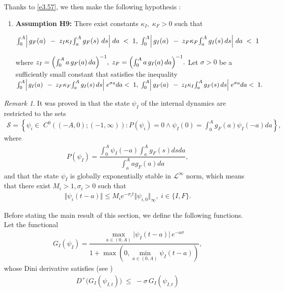 \documentclass[10pt, a4paper]{amsart}
\theoremstyle{plain}
\theoremstyle{definition}
\theoremstyle{remark}
\newtheorem{remark}[lemma]{Remark}
\numberwithin{equation}{section}
\begin{document}
Thanks to \eqref{e3.57}, 
we then make the following hypothesis \cite{ref69} :
\begin{enumerate}
     \item[]  {\bf Assumption H9: }
    There exist constants $\kappa_I,\;\kappa_F>0$ such that%

$\int_{0}^{A}\Bigl|\,
 g_F(a)\,
 \;-\;z_I\kappa_I\!\int_a^A g_F(s)\,\,ds\Bigr|\;da
 \;<\;1,\; \int_{0}^{A}\Bigl|\,g_I(a)\,\;-\;z_F\kappa_F\!\int_a^Ag_I(s)\,ds\Bigr|\;da\;<\;1$

 where $ z_I = \Bigl(\int_{0}^{A}a\,g_F(a)\,da\Bigr)^{-1},\; z_F = \Bigl(\int_{0}^{A}a\,g_I(a)\,da\Bigr)^{-1}.$  Let $\sigma>0$  be a sufficiently small constant that satisfies the inequality 
 $\int_{0}^{A}\Bigl|\,g_I(a)\,\;-\;z_F\kappa_F\!\int_a^A g_I(s)\,ds\Bigr|\;e^{\sigma a}da<\;1,\; 
 \int_{0}^{A}\Bigl|\,
  g_F(a)\,
 \;-\;z_I\kappa_I\!\int_a^A  g_F(s)\,ds\Bigr|
 \;e^{\sigma a}da<\;1.$
 \end{enumerate}
 \begin{remark}
It was proved in \cite{ref69} that the state $\psi_I$ of the internal
dynamics are restricted to the sets 
\begin{align*}
\mathcal{S}=\left\lbrace \psi_i\in\; C^0((-A,0);(-1,\infty)) : P(\psi_i)=0\wedge\psi_I(0)=\displaystyle\int_0^Ag_F(a)\psi_I(-a)da\right\rbrace,
\end{align*}
where
\begin{align*}
P(\psi_I)=\dfrac{\displaystyle\int_0^A\psi_I(-a)\displaystyle\int_a^Ag_F(s)dsda}{\displaystyle\int_a^Aag_F(a)da},
\end{align*}
and that the state $\psi_I$ is globally
exponentially stable in $\mathcal{L}^{\infty}$ norm, which means that there exist $M_i>1,\sigma_i>0$ such that 
\begin{align*}
    \Vert\psi_i(t-a) \Vert \leq M_ie^{-\sigma_i t} \Vert\psi_{i,0} \Vert_{\infty},\; i\in \lbrace I, F\rbrace.
\end{align*}
\end{remark}

Before stating the main result of this section, we define the following functions. Let the functional
\begin{align}\label{e3.89}
    G_I(\psi_I)
= \dfrac{\max_{a\in(0,A)}\bigl|\psi_I(t-a)\bigr|\,e^{-a\sigma}}{1+\max(0,\min_{a\in(0,A)}\psi_I(t-a))},
\end{align}
whose Dini derivative satisfies (see \cite{ref69})
\begin{align}\label{e3.90}
    D^+\bigl(G_I(\psi_{I,t})\bigr)
\;\le\;
-\sigma\,G_I(\psi_{I,t})
\end{align}
\end{document}
